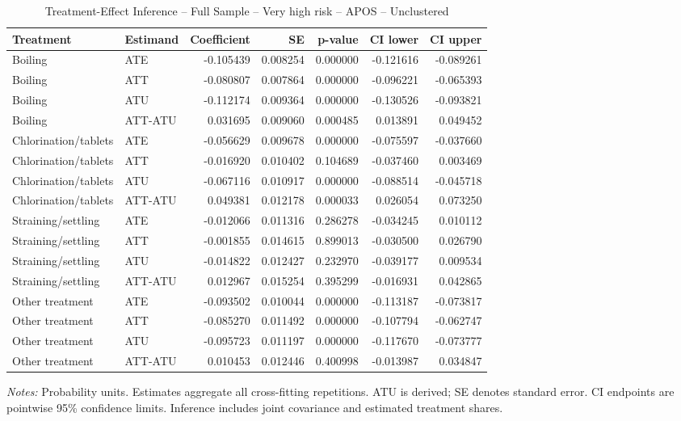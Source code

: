 \begin{table}[htbp]
\centering
\caption{Treatment-Effect Inference -- Full Sample -- Very high risk -- APOS -- Unclustered}
\label{tab:inference-VeryHighRiskHome-APOS-iid}
\scriptsize
\begin{adjustbox}{max width=\linewidth}
\begin{tabular}{llrrrrr}
\toprule
Treatment & Estimand & Coefficient & SE & p-value & CI lower & CI upper \\
\midrule
Boiling & ATE & -0.105439 & 0.008254 & 0.000000 & -0.121616 & -0.089261 \\
Boiling & ATT & -0.080807 & 0.007864 & 0.000000 & -0.096221 & -0.065393 \\
Boiling & ATU & -0.112174 & 0.009364 & 0.000000 & -0.130526 & -0.093821 \\
Boiling & ATT-ATU & 0.031695 & 0.009060 & 0.000485 & 0.013891 & 0.049452 \\
Chlorination/tablets & ATE & -0.056629 & 0.009678 & 0.000000 & -0.075597 & -0.037660 \\
Chlorination/tablets & ATT & -0.016920 & 0.010402 & 0.104689 & -0.037460 & 0.003469 \\
Chlorination/tablets & ATU & -0.067116 & 0.010917 & 0.000000 & -0.088514 & -0.045718 \\
Chlorination/tablets & ATT-ATU & 0.049381 & 0.012178 & 0.000033 & 0.026054 & 0.073250 \\
Straining/settling & ATE & -0.012066 & 0.011316 & 0.286278 & -0.034245 & 0.010112 \\
Straining/settling & ATT & -0.001855 & 0.014615 & 0.899013 & -0.030500 & 0.026790 \\
Straining/settling & ATU & -0.014822 & 0.012427 & 0.232970 & -0.039177 & 0.009534 \\
Straining/settling & ATT-ATU & 0.012967 & 0.015254 & 0.395299 & -0.016931 & 0.042865 \\
Other treatment & ATE & -0.093502 & 0.010044 & 0.000000 & -0.113187 & -0.073817 \\
Other treatment & ATT & -0.085270 & 0.011492 & 0.000000 & -0.107794 & -0.062747 \\
Other treatment & ATU & -0.095723 & 0.011197 & 0.000000 & -0.117670 & -0.073777 \\
Other treatment & ATT-ATU & 0.010453 & 0.012446 & 0.400998 & -0.013987 & 0.034847 \\
\bottomrule
\end{tabular}

\end{adjustbox}
\par\smallskip
\begin{minipage}{\linewidth}\scriptsize \textit{Notes:} Probability units. Estimates aggregate all cross-fitting repetitions. ATU is derived; SE denotes standard error. CI endpoints are pointwise 95\% confidence limits. Inference includes joint covariance and estimated treatment shares. \end{minipage}
\end{table}

